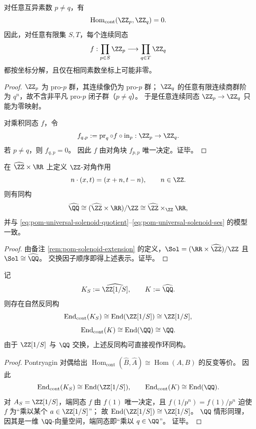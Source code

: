 \begin{theorem}[素数坐标的连续正交性]\label{thm:cdim-star-prime-coordinate-orthogonality}
对任意互异素数 \(p\neq q\)，有
\[
\operatorname{Hom}_{\mathrm{cont}}(\ZZ_p,\ZZ_q)=0.
\]
因此，对任意有限集 \(S,T\)，每个连续同态
\[
f:\prod_{p\in S}\ZZ_p\longrightarrow \prod_{q\in T}\ZZ_q
\]
都按坐标分解，且仅在相同素数坐标上可能非零。
\end{theorem}
\begin{proof}
\(\ZZ_p\) 为 pro-\(p\) 群，其连续像仍为 pro-\(p\) 群；
\(\ZZ_q\) 的任意有限连续商群阶为 \(q^n\)，故不含非平凡 pro-\(p\) 闭子群（\(p\neq q\)）。
于是任意连续同态 \(\ZZ_p\to\ZZ_q\) 只能为零映射。

对乘积同态 \(f\)，令
\[
f_{q,p}:=\operatorname{pr}_q\circ f\circ \operatorname{in}_p:\ZZ_p\to\ZZ_q.
\]
若 \(p\neq q\)，则 \(f_{q,p}=0\)。
因此 \(f\) 由对角块 \(f_{p,p}\) 唯一决定。证毕。
\end{proof}

\begin{proposition}\label{prop:cdim-star-universal-solenoid-fiber-model}
在 \(\widehat{\ZZ}\times \RR\) 上定义 \(\ZZ\)-对角作用
\[
n\cdot(x,t)=(x+n,t-n),\qquad n\in\ZZ.
\]
则有同构
\[
\widehat{\QQ}\cong (\widehat{\ZZ}\times \RR)/\ZZ
\cong \widehat{\ZZ}\times_{\ZZ}\RR,
\]
并与 \eqref{eq:pom-universal-solenoid-quotient}--\eqref{eq:pom-universal-solenoid-ses} 的模型一致。
\end{proposition}
\begin{proof}
由备注 \ref{rem:pom-solenoid-extension} 的定义，\(\Sol=(\RR\times\widehat{\ZZ})/\ZZ\) 且 \(\Sol\cong\widehat{\QQ}\)。
交换因子顺序即得上述表示。证毕。
\end{proof}

\begin{theorem}[局部化与有理化的自同态度值域]\label{thm:cdim-star-endomorphism-localized-degree}
记
\[
K_S:=\widehat{\ZZ[1/S]},\qquad K:=\widehat{\QQ}.
\]
则存在自然反同构
\[
\operatorname{End}_{\mathrm{cont}}(K_S)\cong \operatorname{End}(\ZZ[1/S])\cong \ZZ[1/S],
\]
\[
\operatorname{End}_{\mathrm{cont}}(K)\cong \operatorname{End}(\QQ)\cong \QQ.
\]
由于 \(\ZZ[1/S]\) 与 \(\QQ\) 交换，上述反同构可直接视作环同构。
\end{theorem}
\begin{proof}
Pontryagin 对偶给出
\(
\operatorname{Hom}_{\mathrm{cont}}(\widehat B,\widehat A)\cong \operatorname{Hom}(A,B)
\)
的反变等价。
因此
\[
\operatorname{End}_{\mathrm{cont}}(K_S)\cong \operatorname{End}(\ZZ[1/S]),\qquad
\operatorname{End}_{\mathrm{cont}}(K)\cong \operatorname{End}(\QQ).
\]
对 \(A_S=\ZZ[1/S]\)，端同态 \(f\) 由 \(f(1)\) 唯一决定，且
\(
f(1/p^n)=f(1)/p^n
\)
迫使 \(f\) 为“乘以某个 \(a\in \ZZ[1/S]\)”；
故 \(\operatorname{End}(\ZZ[1/S])\cong \ZZ[1/S]\)。
\(\QQ\) 情形同理，因其是一维 \(\QQ\)-向量空间，端同态即“乘以 \(q\in\QQ\)”。
证毕。
\end{proof}

